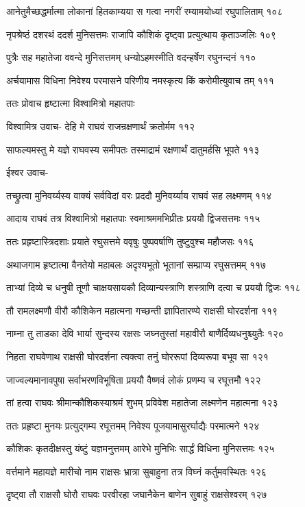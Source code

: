 आनेतुमैच्छद्धर्मात्मा लोकानां हितकाम्यया
स गत्वा नगरीं रम्यामयोध्यां रघुपालिताम् १०८

नृपश्रेष्ठं दशरथं ददर्श मुनिसत्तमः
राजापि कौशिकं दृष्ट्वा प्रत्युत्थाय कृताञ्जलिः १०९

पुत्रैः सह महातेजा ववन्दे मुनिसत्तमम्
धन्योऽहमस्मीति वदन्हर्षेण रघुनन्दनं ११०

अर्चयामास विधिना निवेश्य परमासने
परिणीय नमस्कृत्य किं करोमीत्युवाच तम् १११

ततः प्रोवाच हृष्टात्मा विश्वामित्रो महातपाः

विश्वामित्र उवाच-
देहि मे राघवं राजन्रक्षणार्थं क्रतोर्मम ११२

साफल्यमस्तु मे यज्ञे राघवस्य समीपतः
तस्माद्रामं रक्षणार्थं दातुमर्हसि भूपते ११३

ईश्वर उवाच-

तच्छ्रुत्वा मुनिवर्य्यस्य वाक्यं सर्वविदां वरः
प्रददौ मुनिवर्य्याय राघवं सह लक्ष्मणम् ११४

आदाय राघवं तत्र विश्वामित्रो महातपाः
स्वमाश्रममभिप्रीतः प्रययौ द्विजसत्तमः ११५

ततः प्रहृष्टास्त्रिदशाः प्रयाते रघुसत्तमे
ववृषुः पुष्पवर्षाणि तुष्टुवुश्च महौजसः ११६

अथाजगाम हृष्टात्मा वैनतेयो महाबलः
अदृश्यभूतो भूतानां सम्प्राप्य रघुसत्तमम् ११७

ताभ्यां दिव्ये च धनुषी तूणौ चाक्षयसायकौ
दिव्यान्यस्त्राणि शस्त्राणि दत्वा च प्रययौ द्विजः ११८

तौ रामलक्ष्मणौ वीरौ कौशिकेन महात्मना
गच्छन्ती ज्ञापितारण्ये राक्षसी घोरदर्शना ११९

नाम्ना तु ताडका देवि भार्या सुन्दस्य रक्षसः
जघ्नतुस्तां महावीरौ बाणैर्दिव्यधनुश्च्युतैः १२०

निहता राघवेणाथ राक्षसी घोरदर्शना
त्यक्त्वा तनुं घोररूपां दिव्यरूपा बभूव सा १२१

जाज्वल्यमानावपुषा सर्वाभरणविभूषिता
प्रययौ वैष्णवं लोकं प्रणम्य च रघूत्तमौ १२२

तां हत्वा राघवः श्रीमान्कौशिकस्याश्रमं शुभम्
प्रविवेश महातेजा लक्ष्मणेन महात्मना १२३

ततः प्रहृष्टा मुनयः प्रत्युद्गम्य रघूत्तमम्
निवेश्य पूजयामासुरर्घाद्यैः परमात्मने १२४

कौशिकः कृतदीक्षस्तु यंष्टुं यज्ञमनुत्तमम्
आरेभे मुनिभिः सार्द्धं विधिना मुनिसत्तमः १२५

वर्त्तमाने महायज्ञे मारीचो नाम राक्षसः
भ्रात्रा सुबाहुना तत्र विघ्नं कर्तुमवस्थितः १२६

दृष्ट्वा तौ राक्षसौ घोरौ राघवः परवीरहा
जघानैकेन बाणेन सुबाहुं राक्षसेश्वरम् १२७

